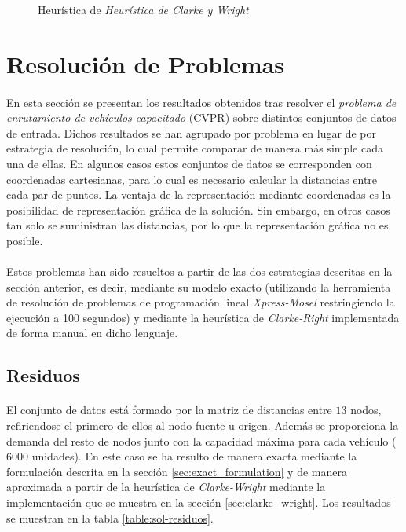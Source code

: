 \documentclass[spanish]{article}
\begin{document}
			\begin{figure}
	      \centering
	      \caption{Heurística de \emph{Heurística de Clarke y Wright}}
	      \label{code:clarke_wright}
	    \end{figure}

	\section{Resolución de Problemas}

		\paragraph{}
		En esta sección se presentan los resultados obtenidos tras resolver el \emph{problema de enrutamiento de vehículos capacitado} (CVPR) sobre distintos conjuntos de datos de entrada. Dichos resultados se han agrupado por problema en lugar de por estrategia de resolución, lo cual permite comparar de manera más simple cada una de ellas. En algunos casos estos conjuntos de datos se corresponden con coordenadas cartesianas, para lo cual es necesario calcular la distancias entre cada par de puntos. La ventaja de la representación mediante coordenadas es la posibilidad de representación gráfica de la solución. Sin embargo, en otros casos tan solo se suministran las distancias, por lo que la representación gráfica no es posible.

		\paragraph{}
		Estos problemas han sido resueltos a partir de las dos estrategias descritas en la sección anterior, es decir, mediante su modelo exacto (utilizando la herramienta de resolución de problemas de programación lineal \emph{Xpress-Mosel}\cite{tool:xpress-mosel} restringiendo la ejecución a 100 segundos) y mediante la heurística de \emph{Clarke-Right} implementada de forma manual en dicho lenguaje.


		\subsection{Residuos}

			\paragraph{}
			El conjunto de datos está formado por la matriz de distancias entre $13$ nodos, refiriendose el primero de ellos al nodo fuente u origen. Además se proporciona la demanda del resto de nodos junto con la capacidad máxima para cada vehículo ($6000$ unidades). En este caso se ha resulto de manera exacta mediante la formulación descrita en la sección \ref{sec:exact_formulation} y de manera aproximada a partir de la heurística de \emph{Clarke-Wright} mediante la implementación que se muestra en la sección \ref{sec:clarke_wright}. Los resultados se muestran en la tabla \ref{table:sol-residuos}.
\end{document}
